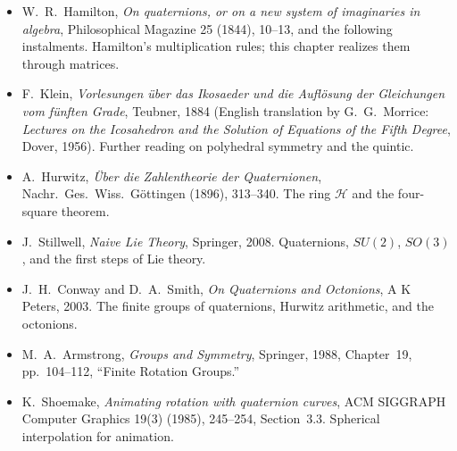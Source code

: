 \begin{itemize}
\item W.~R.~Hamilton, \emph{On quaternions, or on a new system of imaginaries in algebra}, Philosophical Magazine 25 (1844), 10--13, and the following instalments. Hamilton's multiplication rules; this chapter realizes them through matrices.
\item F.~Klein, \emph{Vorlesungen über das Ikosaeder und die Auflösung der Gleichungen vom fünften Grade}, Teubner, 1884 (English translation by G.~G.~Morrice: \emph{Lectures on the Icosahedron and the Solution of Equations of the Fifth Degree}, Dover, 1956). Further reading on polyhedral symmetry and the quintic.
\item A.~Hurwitz, \emph{Über die Zahlentheorie der Quaternionen}, Nachr.\ Ges.\ Wiss.\ Göttingen (1896), 313--340. The ring $\mathcal H$ and the four-square theorem.
\item J.~Stillwell, \emph{Naive Lie Theory}, Springer, 2008. Quaternions, $SU(2)$, $SO(3)$, and the first steps of Lie theory.
\item J.~H.~Conway and D.~A.~Smith, \emph{On Quaternions and Octonions}, A K Peters, 2003. The finite groups of quaternions, Hurwitz arithmetic, and the octonions.
\item M.~A.~Armstrong, \emph{Groups and Symmetry}, Springer, 1988, Chapter~19, pp.~104--112, ``Finite Rotation Groups.''
\item K.~Shoemake, \emph{Animating rotation with quaternion curves}, ACM SIGGRAPH Computer Graphics 19(3) (1985), 245--254, Section~3.3. Spherical interpolation for animation.
\end{itemize}
